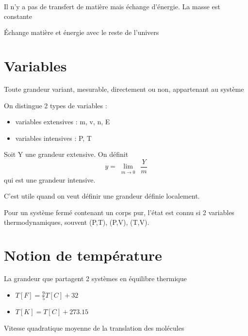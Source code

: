 \documentclass[french]{yLectureNote}
\newcommand{\Lim}[1]{\lim\limits_{\substack{#1}}\:}
\begin{document}
\begin{definition}
    Il n'y a pas de transfert de matière mais échange d'énergie. La masse est constante
\end{definition}
\begin{definition}
    Échange matière et énergie avec le reste de l'univers
\end{definition}
\section{Variables}
\begin{definition}
    Toute grandeur variant, mesurable, directement ou non, appartenant au système
\end{definition}
On distingue 2 types de variables :
\begin{itemize}
    \item variables extensives : m, v, n, E
    \item variables intensives : P, T
\end{itemize}
\begin{definition}
    Soit Y une grandeur extensive. On définit $$y = \Lim{m\to 0}\frac{Y}{m}$$ qui est une grandeur intensive.
\end{definition}
C'est utile quand on veut définir une grandeur définie localement.
\begin{theorem}
    Pour un système fermé contenant un corps pur, l'état est connu si 2 variables thermodynamiques, souvent (P,T), (P,V), (T,V).
\end{theorem}
\section{Notion de température}
\begin{definition}[Température]
    La grandeur que partagent 2 systèmes en équilibre thermique
\end{definition}
\begin{theorem}
    \begin{itemize}
        \item $T[F] = \frac95 T[C]+32$
        \item $T[K] = T[C]+273.15$
    \end{itemize}
\end{theorem}
\begin{definition}
    Vitesse quadratique moyenne de la translation des molécules
\end{definition}
\end{document}
